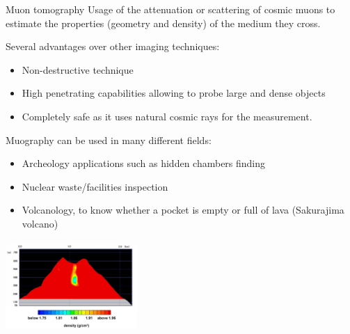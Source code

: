 \documentclass[8 pt]{beamer}
\begin{document}
\begin{frame}{Muon tomography}
Usage of the attenuation or scattering of cosmic muons to estimate the properties (geometry and density) of the medium they cross. \vfill

Several advantages over other imaging techniques:
\begin{itemize}
\justifying
\item Non-destructive technique
\item High penetrating capabilities allowing to probe large and dense objects
\item Completely safe as it uses natural cosmic rays for the measurement.
\end{itemize} \vspace{10pt}

\begin{minipage}[c]{.54\textwidth}
\justifying

	Muography can be used in many different fields:
\begin{itemize}
	\justifying
	\item Archeology applications such as hidden chambers finding 
	\item Nuclear waste/facilities inspection
	\item Volcanology, to know whether a pocket is empty or full of lava (Sakurajima volcano)
\end{itemize}	
	
\end{minipage} \hfill
\begin{minipage}[c]{.44\textwidth}
	\begin{center}
	\includegraphics[width=5cm, height=3.5cm]{figs/volcano.jpg}
	\end{center}
\end{minipage} \hfill \vfill
\end{frame}
\end{document}
